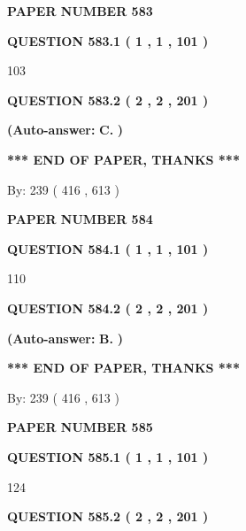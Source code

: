 \documentclass[12pt]{article}
\begin{document}
   
\newpage 
\setcounter{page}{ 
   583001 } 
   
   
 {\textbf{ \Large{ PAPER NUMBER  583  }}}
   
   
   
   
  
  
{\textbf{\large{QUESTION
583.1 
 ( 1 , 1 , 101 )
}}}

103
  
  
{\textbf{\large{QUESTION
583.2 
 ( 2 , 2 , 201 )
}}}
 
 
{\textbf{(Auto-answer:}}
{\textbf{\large{
C.}}}
{\textbf{)}}
 
 
   
   
   
   
\vspace{1.0in} 
{\textbf{\large{ *** END OF PAPER, THANKS *** }}} 
   
   
\hspace{1.0in} By: 
 239 ( 416 ,  613 )
   
   
   
   
\newpage 
\setcounter{page}{ 
   584001 } 
   
   
 {\textbf{ \Large{ PAPER NUMBER  584  }}}
   
   
   
   
  
  
{\textbf{\large{QUESTION
584.1 
 ( 1 , 1 , 101 )
}}}

110
  
  
{\textbf{\large{QUESTION
584.2 
 ( 2 , 2 , 201 )
}}}
 
 
{\textbf{(Auto-answer:}}
{\textbf{\large{
B.}}}
{\textbf{)}}
 
 
   
   
   
   
\vspace{1.0in} 
{\textbf{\large{ *** END OF PAPER, THANKS *** }}} 
   
   
\hspace{1.0in} By: 
 239 ( 416 ,  613 )
   
   
   
   
\newpage 
\setcounter{page}{ 
   585001 } 
   
   
 {\textbf{ \Large{ PAPER NUMBER  585  }}}
   
   
   
   
  
  
{\textbf{\large{QUESTION
585.1 
 ( 1 , 1 , 101 )
}}}

124
  
  
{\textbf{\large{QUESTION
585.2 
 ( 2 , 2 , 201 )
}}}
 
\end{document}
